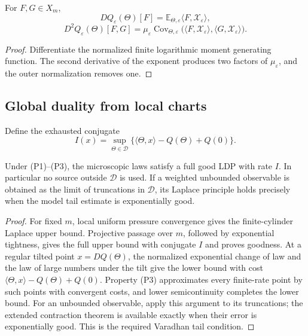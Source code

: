 \begin{proposition}
\label{prop:r5-d1-normalization}
For \(F,G\in X_m\),
\[
 DQ_\varepsilon(\Theta)[F]
 =\mathbb E_{\Theta,\varepsilon}
 \langle F,\mathcal X_\varepsilon\rangle,
\]
\[
 D^2Q_\varepsilon(\Theta)[F,G]
 =\mu_\varepsilon
 \operatorname{Cov}_{\Theta,\varepsilon}
 \bigl(\langle F,\mathcal X_\varepsilon\rangle,
       \langle G,\mathcal X_\varepsilon\rangle\bigr).
\]
\end{proposition}

\begin{proof}
Differentiate the normalized finite logarithmic moment generating function.
The second derivative of the exponent produces two factors of
\(\mu_\varepsilon\), and the outer normalization removes one.
\end{proof}

\subsection{Global duality from local charts}

Define the exhausted conjugate
\[
 I(x)=\sup_{\Theta\in\mathcal D}
 \{\langle\Theta,x\rangle-Q(\Theta)+Q(0)\}.
\]

\begin{theorem}
\label{thm:r5-d1-exhaustion}
Under (P1)--(P3), the microscopic laws satisfy a full good LDP with rate
\(I\).  In particular no source outside \(\mathcal D\) is used.  If a weighted
unbounded observable is obtained as the limit of truncations in
\(\mathcal D\), its Laplace principle holds precisely when the model tail
estimate is exponentially good.
\end{theorem}

\begin{proof}
For fixed \(m\), local uniform pressure convergence gives the finite-cylinder
Laplace upper bound.  Projective passage over \(m\), followed by exponential
tightness, gives the full upper bound with conjugate \(I\) and proves goodness.
At a regular tilted point \(x=DQ(\Theta)\), the normalized exponential change
of law and the law of large numbers under the tilt give the lower bound with
cost
\(\langle\Theta,x\rangle-Q(\Theta)+Q(0)\).  Property (P3) approximates every
finite-rate point by such points with convergent costs, and lower
semicontinuity completes the lower bound.  For an unbounded observable, apply
this argument to its truncations; the extended contraction theorem is
available exactly when their error is exponentially good.  This is the
required Varadhan tail condition.
\end{proof}

